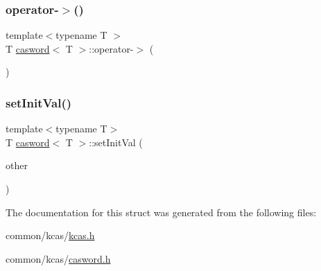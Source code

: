 \mbox{\label{structcasword_ab6b758d075768501b8915eebf602c54e}} 
\subsubsection{\texorpdfstring{operator-\/$>$()}{operator->()}}
{\footnotesize\ttfamily template$<$typename T $>$ \\
T \hyperlink{structcasword}{casword}$<$ T $>$\+::operator-\/$>$ (\begin{DoxyParamCaption}{ }\end{DoxyParamCaption})}

\mbox{\label{structcasword_af443268d0da3bee38b712912850210e6}} 
\subsubsection{\texorpdfstring{set\+Init\+Val()}{setInitVal()}}
{\footnotesize\ttfamily template$<$typename T$>$ \\
T \hyperlink{structcasword}{casword}$<$ T $>$\+::set\+Init\+Val (\begin{DoxyParamCaption}\item[{T}]{other }\end{DoxyParamCaption})}



The documentation for this struct was generated from the following files\+:\begin{DoxyCompactItemize}
\item 
common/kcas/\hyperlink{kcas_8h}{kcas.\+h}\item 
common/kcas/\hyperlink{casword_8h}{casword.\+h}\end{DoxyCompactItemize}
